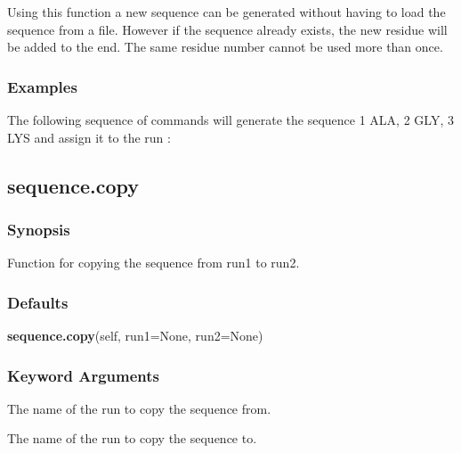  Using this function a new sequence can be generated without having to load the sequence from a file.  However if the sequence already exists, the new residue will be added to the end. The same residue number cannot be used more than once. 
  

  
 \subsubsection{Examples} 

 The following sequence of commands will generate the sequence 1 ALA, 2 GLY, 3 LYS and assign it to the run : 
  





  

 \newpage 

 \subsection{sequence.copy} 

  
 \subsubsection{Synopsis} 

 Function for copying the sequence from run1 to run2. 
  

  
 \subsubsection{Defaults} 

 \textsf{\textbf{sequence.copy}(self, run1=None, run2=None)} 

  
 \subsubsection{Keyword Arguments} 

   The name of the run to copy the sequence from.   

   The name of the run to copy the sequence to.  

